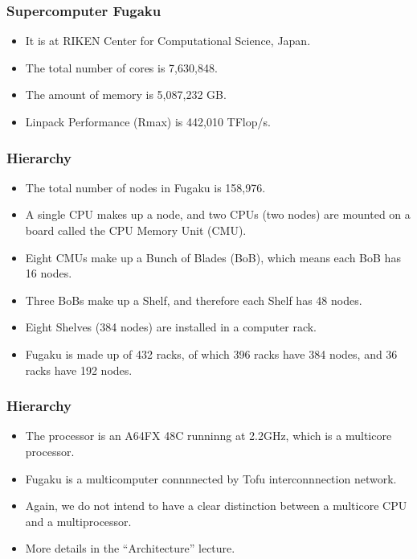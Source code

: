 \documentclass{beamer}
\begin{document}
\begin{CJK}{UTF8}{bsmi}
  \begin{frame}
    \frametitle{Supercomputer Fugaku}
    \begin{itemize}
    \item It is at RIKEN Center for Computational Science, Japan.
    \item The total number of cores is 7,630,848.
    \item The amount of memory is 5,087,232 GB.
    \item Linpack Performance (Rmax) is 442,010 TFlop/s.
    \end{itemize}
  \end{frame}

  \begin{frame}
    \frametitle{Hierarchy}
    \begin{itemize}
    \item The total number of nodes in Fugaku is 158,976.
    \item A single CPU makes up a node, and two CPUs (two nodes) are
      mounted on a board called the CPU Memory Unit (CMU).
    \item Eight CMUs make up a Bunch of Blades (BoB), which means each BoB
      has 16 nodes.
    \item Three BoBs make up a Shelf, and therefore each Shelf has 48 nodes.
    \item Eight Shelves (384 nodes) are installed in a computer rack.
    \item Fugaku is made up of 432 racks, of which 396 racks have 384 nodes, and 36 racks have 192 nodes.
    \end{itemize}
  \end{frame}

  \begin{frame}
    \frametitle{Hierarchy}
    \begin{itemize}
    \item The processor is an A64FX 48C runninng at 2.2GHz, which is a multicore processor.
    \item Fugaku is a multicomputer connnnected by Tofu interconnnection network.
    \item Again, we do not intend to have a clear distinction between a
      multicore CPU and a multiprocessor.
    \item More details in the ``Architecture'' lecture.
    \end{itemize}
  \end{frame}


\end{CJK}
\end{document}

